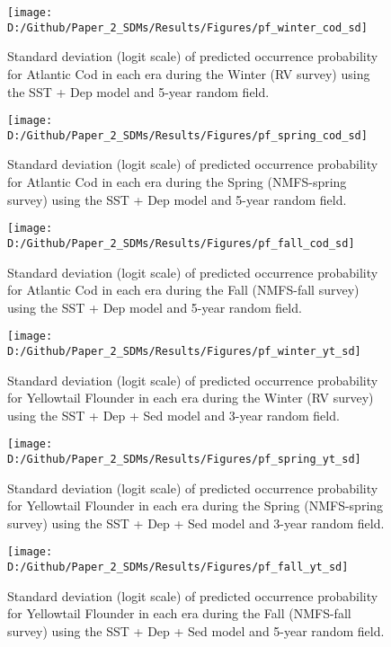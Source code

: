 \documentclass[
]{article}
\begin{document}
\begin{landscape}
\newpage

\begin{figure}
\texttt{[image: D:/Github/Paper\_2\_SDMs/Results/Figures/pf\_winter\_cod\_sd]} \caption{Standard deviation (logit scale) of predicted occurrence probability for Atlantic Cod  in each era during the Winter (RV survey) using the SST + Dep model and 5-year random field.}\label{fig:pf-winter-cod-sd}
\end{figure}

\newpage
\begin{figure}
\texttt{[image: D:/Github/Paper\_2\_SDMs/Results/Figures/pf\_spring\_cod\_sd]} \caption{Standard deviation (logit scale) of predicted occurrence probability for Atlantic Cod  in each era during the Spring (NMFS-spring survey) using the SST + Dep model and 5-year random field.}\label{fig:pf-spring-cod-sd}
\end{figure}

\newpage
\begin{figure}
\texttt{[image: D:/Github/Paper\_2\_SDMs/Results/Figures/pf\_fall\_cod\_sd]} \caption{Standard deviation (logit scale) of predicted occurrence probability for Atlantic Cod  in each era during the Fall (NMFS-fall survey) using the SST + Dep model and 5-year random field.}\label{fig:pf-fall-cod-sd}
\end{figure}

\newpage
\begin{figure}
\texttt{[image: D:/Github/Paper\_2\_SDMs/Results/Figures/pf\_winter\_yt\_sd]} \caption{Standard deviation (logit scale) of predicted occurrence probability for Yellowtail Flounder in each era during the Winter (RV survey) using the SST + Dep + Sed  model and 3-year random field.}\label{fig:pf-winter-yt-sd}
\end{figure}

\newpage

\begin{figure}
\texttt{[image: D:/Github/Paper\_2\_SDMs/Results/Figures/pf\_spring\_yt\_sd]} \caption{Standard deviation (logit scale) of predicted occurrence probability for Yellowtail Flounder in each era during the Spring (NMFS-spring survey) using the  SST + Dep + Sed  model and 3-year random field.}\label{fig:pf-spring-yt-sd}
\end{figure}

\newpage
\begin{figure}
\texttt{[image: D:/Github/Paper\_2\_SDMs/Results/Figures/pf\_fall\_yt\_sd]} \caption{Standard deviation (logit scale) of predicted occurrence probability for Yellowtail Flounder in each era during the Fall (NMFS-fall survey) using the SST + Dep + Sed  model and 5-year random field.}\label{fig:pf-fall-yt-sd}
\end{figure}
\end{landscape}
\end{document}
